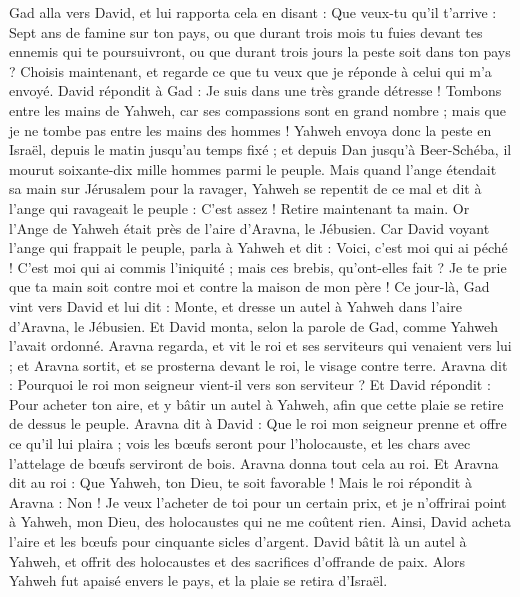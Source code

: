 \begin{multicols}{2}
Gad alla vers David, et lui rapporta cela en disant : Que veux-tu qu'il t'arrive : Sept ans de famine sur ton pays, ou que durant trois mois tu fuies devant tes ennemis qui te poursuivront, ou que durant trois jours la peste soit dans ton pays ? Choisis maintenant, et regarde ce que tu veux que je réponde à celui qui m'a envoyé.
David répondit à Gad : Je suis dans une très grande détresse ! Tombons entre les mains de Yahweh, car ses compassions sont en grand nombre ; mais que je ne tombe pas entre les mains des hommes !
Yahweh envoya donc la peste en Israël, depuis le matin jusqu'au temps fixé ; et depuis Dan jusqu'à Beer-Schéba, il mourut soixante-dix mille hommes parmi le peuple.
Mais quand l'ange étendait sa main sur Jérusalem pour la ravager, Yahweh se repentit de ce mal et dit à l'ange qui ravageait le peuple : C'est assez ! Retire maintenant ta main. Or l'Ange de Yahweh était près de l'aire d'Aravna, le Jébusien.
Car David voyant l'ange qui frappait le peuple, parla à Yahweh et dit : Voici, c'est moi qui ai péché ! C'est moi qui ai commis l'iniquité ; mais ces brebis, qu'ont-elles fait ? Je te prie que ta main soit contre moi et contre la maison de mon père !
Ce jour-là, Gad vint vers David et lui dit : Monte, et dresse un autel à Yahweh dans l'aire d'Aravna, le Jébusien.
Et David monta, selon la parole de Gad, comme Yahweh l'avait ordonné.
Aravna regarda, et vit le roi et ses serviteurs qui venaient vers lui ; et Aravna sortit, et se prosterna devant le roi, le visage contre terre.
Aravna dit : Pourquoi le roi mon seigneur vient-il vers son serviteur ? Et David répondit : Pour acheter ton aire, et y bâtir un autel à Yahweh, afin que cette plaie se retire de dessus le peuple.
Aravna dit à David : Que le roi mon seigneur prenne et offre ce qu'il lui plaira ; vois les bœufs seront pour l'holocauste, et les chars avec l'attelage de bœufs serviront de bois.
Aravna donna tout cela au roi. Et Aravna dit au roi : Que Yahweh, ton Dieu, te soit favorable !
Mais le roi répondit à Aravna : Non ! Je veux l'acheter de toi pour un certain prix, et je n'offrirai point à Yahweh, mon Dieu, des holocaustes qui ne me coûtent rien. Ainsi, David acheta l'aire et les bœufs pour cinquante sicles d'argent.
David bâtit là un autel à Yahweh, et offrit des holocaustes et des sacrifices d'offrande de paix. Alors Yahweh fut apaisé envers le pays, et la plaie se retira d'Israël.
\PPE{}
\end{multicols}